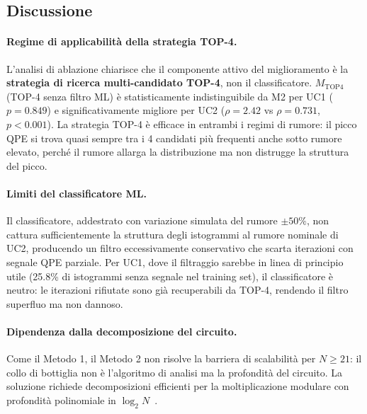 \begin{onehalfspace}
\section{Discussione}
\label{sec:discussione_m2}

\paragraph{Regime di applicabilità della strategia TOP-4.}
L'analisi di ablazione chiarisce che il componente attivo del miglioramento è la \textbf{strategia di ricerca multi-candidato TOP-4}, non il classificatore. $M_{\text{TOP4}}$ (TOP-4 senza filtro ML) è statisticamente indistinguibile da M2 per UC1 ($p = 0.849$) e significativamente migliore per UC2 ($\rho = 2.42$ vs $\rho = 0.731$, $p < 0.001$). La strategia TOP-4 è efficace in entrambi i regimi di rumore: il picco QPE si trova quasi sempre tra i 4 candidati più frequenti anche sotto rumore elevato, perché il rumore allarga la distribuzione ma non distrugge la struttura del picco.

\paragraph{Limiti del classificatore ML.}
Il classificatore, addestrato con variazione simulata del rumore $\pm50\%$, non cattura sufficientemente la struttura degli istogrammi al rumore nominale di UC2, producendo un filtro eccessivamente conservativo che scarta iterazioni con segnale QPE parziale. Per UC1, dove il filtraggio sarebbe in linea di principio utile (25.8\% di istogrammi senza segnale nel training set), il classificatore è neutro: le iterazioni rifiutate sono già recuperabili da TOP-4, rendendo il filtro superfluo ma non dannoso.

\paragraph{Dipendenza dalla decomposizione del circuito.}
Come il Metodo 1, il Metodo 2 non risolve la barriera di scalabilità per $N \geq 21$: il collo di bottiglia non è l'algoritmo di analisi ma la profondità del circuito. La soluzione richiede decomposizioni efficienti per la moltiplicazione modulare con profondità polinomiale in $\log_2 N$~\cite{beauregard2002}.

\end{onehalfspace}
